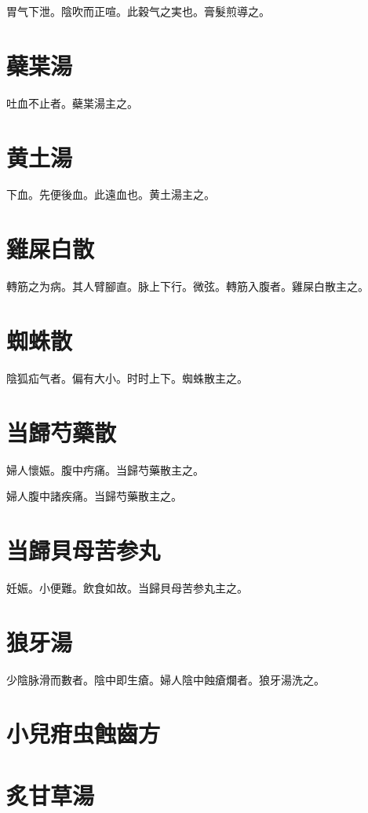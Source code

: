 \documentclass[12pt,twoside,UTF8,b5paper]{ctexbook}
\begin{document}
胃气下泄。陰吹而正喧。此穀气之実也。膏髮煎導之。

\section{蘗枼湯}

吐血不止者。蘗枼湯主之。

\section{黄土湯}

下血。先便後血。此遠血也。黄土湯主之。

\section{雞屎白散}

轉筋之为病。其人臂腳直。脉上下行。微弦。轉筋入腹者。雞屎白散主之。

\section{蜘蛛散}

陰狐疝气者。偏有大小。时时上下。蜘蛛散主之。

\section{当歸芍藥散}

婦人懷娠。腹中㽲痛。当歸芍藥散主之。

婦人腹中諸疾痛。当歸芍藥散主之。

\section{当歸貝母苦参丸}

妊娠。小便難。飲食如故。当歸貝母苦参丸主之。

\section{狼牙湯}

少陰脉滑而數者。陰中即生瘡。{婦人}陰中蝕瘡爛者。狼牙湯洗之。

\section{小兒疳虫蝕齒方}

\section{炙甘草湯}
\end{document}
